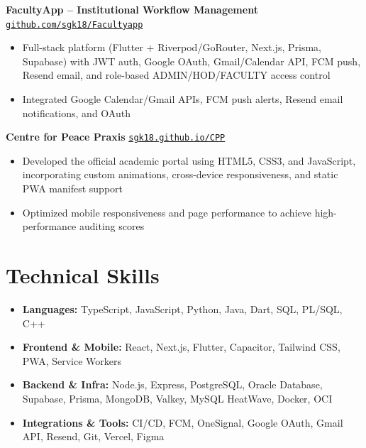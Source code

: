 \documentclass[10pt,a4paper]{article}
\newcommand{\project}[3]{%
  \noindent\textbf{#1} \hfill \href{#2}{\texttt{\small #3}}\par
}
\begin{document}
\vspace{2pt}
\project{FacultyApp -- Institutional Workflow Management}{https://github.com/sgk18/Facultyapp}{github.com/sgk18/Facultyapp}
\begin{itemize}
  \item Full-stack platform (Flutter + Riverpod/GoRouter, Next.js, Prisma, Supabase) with JWT auth, Google OAuth, Gmail/Calendar API, FCM push, Resend email, and role-based ADMIN/HOD/FACULTY access control
  \item Integrated Google Calendar/Gmail APIs, FCM push alerts, Resend email notifications, and OAuth
\end{itemize}

\vspace{2pt}
\project{Centre for Peace Praxis}{https://sgk18.github.io/CPP}{sgk18.github.io/CPP}
\begin{itemize}
  \item Developed the official academic portal using HTML5, CSS3, and JavaScript, incorporating custom animations, cross-device responsiveness, and static PWA manifest support
  \item Optimized mobile responsiveness and page performance to achieve high-performance auditing scores
\end{itemize}

\section*{Technical Skills}
\begin{itemize}
  \item \textbf{Languages:} TypeScript, JavaScript, Python, Java, Dart, SQL, PL/SQL, C++
  \item \textbf{Frontend \& Mobile:} React, Next.js, Flutter, Capacitor, Tailwind CSS, PWA, Service Workers
  \item \textbf{Backend \& Infra:} Node.js, Express, PostgreSQL, Oracle Database, Supabase, Prisma, MongoDB, Valkey, MySQL HeatWave, Docker, OCI
  \item \textbf{Integrations \& Tools:} CI/CD, FCM, OneSignal, Google OAuth, Gmail API, Resend, Git, Vercel, Figma
\end{itemize}

\end{document}
